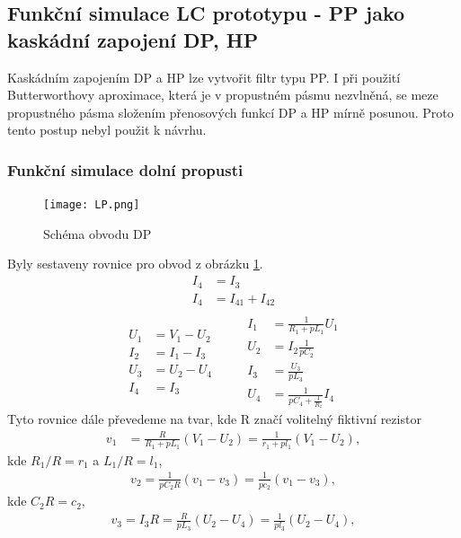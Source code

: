 \subsection{Funkční simulace LC prototypu - PP jako kaskádní zapojení DP, HP}
\noindent Kaskádním zapojením DP a HP lze vytvořit filtr typu PP. I při použití Butterworthovy aproximace, která je v propustném pásmu nezvlněná, se meze propustného pásma složením přenosových funkcí DP a HP mírně posunou. Proto tento postup nebyl použit k návrhu.
\subsubsection{Funkční simulace dolní propusti}
\begin{figure}[h]
\centering
\texttt{[image: LP.png]}
\caption{Schéma obvodu DP \label{s:LP12}}
\end{figure}
Byly sestaveny rovnice pro obvod z obrázku \ref{s:LP12}.
\begin{align}
I_4 &= I_3\\
I_4 &= I_{41} + I_{42} \\
\end{align}
\begin{equation}
\begin{split}
U_1 &= V_1 - U_2 \\
I_2 &= I_1 - I_3 \\
U_3 &= U_2 - U_4\\
I_4 &= I_3
\end{split}
\quad \quad
\begin{split}
I_1 &= \frac{1}{R_1 + pL_1}U_1 \\
U_2 &= I_2\frac{1}{pC_2}\\
I_3 &= \frac{U_3}{pL_3}\\
U_4 &= \frac{1}{pC_4 + \frac{1}{R_z}}I_4
\end{split}
\end{equation}
Tyto rovnice dále převedeme na tvar, kde R značí volitelný fiktivní rezistor
\begin{align}
v_1 &= \frac{R}{R_1 + pL_1}(V_1 - U_2) = \frac{1}{r_1 + pl_1}(V_1 - U_2),
\end{align}
kde $R_1/R = r_1$ a $L_1/R = l_1$,
\begin{align}
v_2 = \frac{1}{pC_2R}(v_1 - v_3) = \frac{1}{pc_2}(v_1 - v_3),
\end{align}
kde $C_2R = c_2$,
\begin{align}
v_3 = I_3R = \frac{R}{pL_3}(U_2 - U_4) = \frac{1}{pl_3}(U_2 - U_4),
\end{align}
